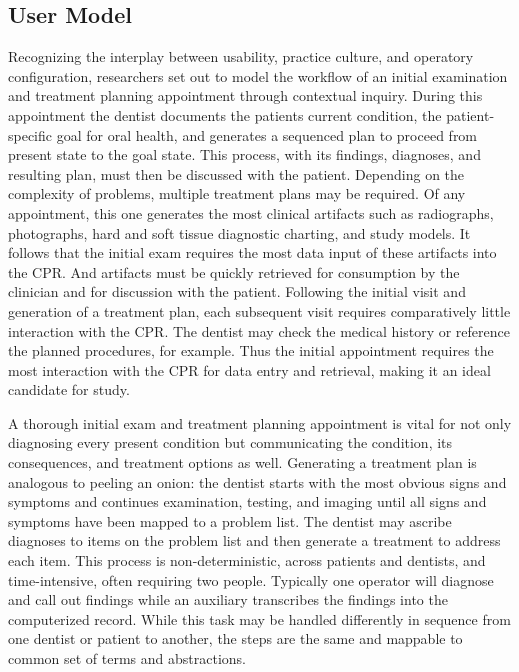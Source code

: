 \documentclass[11pt]{article}
\begin{document}
\subsection{User Model}
Recognizing the interplay between usability, practice culture, and operatory configuration, researchers set out to model the workflow of an initial examination and treatment planning appointment through contextual inquiry\cite{Irwin2009A-preliminary-m}. During this appointment the dentist documents the patients current condition, the patient-specific goal for oral health, and generates a sequenced plan to proceed from present state to the goal state. This process, with its findings, diagnoses, and resulting plan, must then be discussed with the patient. Depending on the complexity of problems, multiple treatment plans may be required. Of any appointment, this one generates the most clinical artifacts such as radiographs, photographs, hard and soft tissue diagnostic charting,  and study models. It follows that the initial exam requires the most data input of these artifacts into the CPR. And artifacts must be quickly retrieved for consumption by the clinician and for discussion with the patient. Following the initial visit and generation of a treatment plan, each subsequent visit requires comparatively little interaction with the CPR. The dentist may check the medical history or reference the planned procedures, for example. Thus the initial appointment requires the most interaction with the CPR for data entry and retrieval, making it an ideal candidate for study.

A thorough initial exam and treatment planning appointment is vital for not only diagnosing every present condition but communicating the condition, its consequences, and treatment options as well. Generating a treatment plan is analogous to peeling an onion: the dentist starts with the most obvious signs and symptoms and continues examination, testing, and imaging until all signs and symptoms have been mapped to a problem list. The dentist may ascribe diagnoses to items on the problem list and then generate a treatment to address each item. This process is non-deterministic, across patients and dentists, and time-intensive, often requiring two people. Typically one operator will diagnose and call out findings while an auxiliary transcribes the findings into the computerized record. While this task may be handled differently in sequence from one dentist or patient to another, the steps are the same and mappable to common set of terms and abstractions. 
\end{document}
